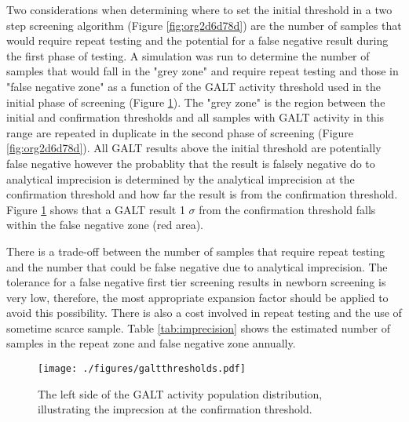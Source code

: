 \documentclass[review]{elsarticle}
\begin{document}
Two considerations when determining where to set the initial threshold
in a two step screening algorithm (Figure \ref{fig:org2d6d78d}) are the
number of samples that would require repeat testing and the potential
for a false negative result during the first phase of testing. A
simulation was run to determine the number of samples that would fall
in the "grey zone" and require repeat testing and those in "false
negative zone" as a function of the GALT activity threshold used in
the initial phase of screening (Figure \ref{fig:org9bfd3ab}). The "grey
zone" is the region between the initial and confirmation thresholds
and all samples with GALT activity in this range are repeated in
duplicate in the second phase of screening (Figure \ref{fig:org2d6d78d}). All
GALT results above the initial threshold are potentially false
negative however the probablity that the result is falsely negative do
to analytical imprecision is determined by the analytical imprecision
at the confirmation threshold and how far the result is from the
confirmation threshold. Figure \ref{fig:org9bfd3ab} shows that a GALT result 1 \(\sigma\)
from the confirmation threshold falls within the false negative zone
(red area).

There is a trade-off between the number of samples that require repeat
testing and the number that could be false negative due to analytical
imprecision. The tolerance for a false negative first tier screening
results in newborn screening is very low, therefore, the most
appropriate expansion factor should be applied to avoid this
possibility. There is also a cost involved in repeat testing and the
use of sometime scarce sample. Table \ref{tab:imprecision} shows the
estimated number of samples in the repeat zone and false negative zone
annually.

\begin{figure}[htbp]
\centering
\texttt{[image: ./figures/galtthresholds.pdf]}
\caption{\label{fig:org9bfd3ab}The left side of the GALT activity population distribution, illustrating the imprecsion at the confirmation threshold.}
\end{figure}
\end{document}
